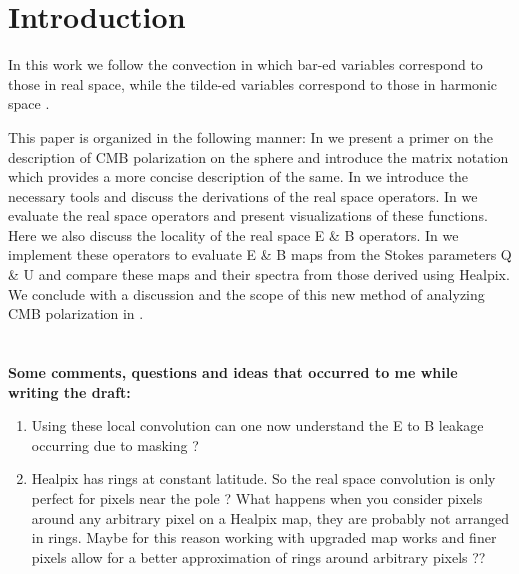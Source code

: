\section{Introduction}

In this work we follow the convection in which bar-ed variables correspond to those in real space, while the tilde-ed variables correspond to those in harmonic space \cite{Zaldarriaga2001a}. 

This paper is organized in the following manner: In  we present a primer on the description of CMB polarization on the sphere and introduce the matrix notation which provides a more concise description of the same. In  we introduce the necessary tools  and discuss the derivations of the real space operators. In  we evaluate the real space operators and present visualizations of these functions. Here we also discuss the locality of the real space E \& B operators. In  we implement these operators to evaluate E \& B  maps from the Stokes parameters Q \& U and compare these maps and their spectra from those derived using Healpix. We conclude with a discussion and the scope of this new method of analyzing CMB polarization in .\\ \\ \\ 


\textbf{Some comments, questions and ideas that occurred to me while writing the draft:}
\begin{enumerate}
\item Using these local convolution can one now understand the E to B leakage occurring due to masking ? 

\item Healpix has rings at constant latitude. So the real space convolution is only perfect for pixels near the pole ? What happens when you consider pixels around any arbitrary pixel on a Healpix map, they are probably not arranged in rings. Maybe for this reason working with upgraded map works and finer pixels allow for a better approximation of rings around arbitrary pixels ??
\end{enumerate}

